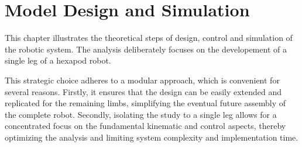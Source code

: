 \chapter{Model Design and Simulation}
\label{ch:model}

This chapter illustrates the theoretical steps of design, control and simulation of the robotic system. The analysis
deliberately focuses on the developement of a single leg of a hexapod robot.

This strategic choice adheres to a modular approach, which is convenient for several reasons.
Firstly, it ensures that the design can be easily extended and replicated for the remaining limbs, simplifying
the eventual future assembly of the complete robot. Secondly, isolating the study to a single leg allows for a
concentrated focus on the fundamental kinematic and control aspects, thereby optimizing the analysis and
limiting system complexity and implementation time.




